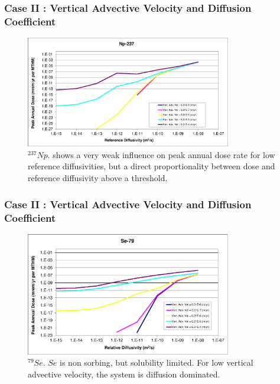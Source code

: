 \begin{frame}[c]
  \frametitle{Case II : Vertical Advective Velocity and Diffusion Coefficient}
\begin{figure}[htp!]
\centering
\includegraphics[width=0.8\textwidth]{AdvVelAndDiffCoeffEBSFail/Np-237.eps}
\caption{$^{237}Np$.
shows a very weak influence on peak annual dose 
rate for low reference diffusivities, but a direct proportionality between 
dose and reference diffusivity above a threshold.}
\label{fig:VAdvVelNp237}
\end{figure}
\end{frame}

\begin{frame}[c]
  \frametitle{Case II : Vertical Advective Velocity and Diffusion Coefficient}
\begin{figure}[htp!]
\centering
\includegraphics[width=0.8\textwidth]{AdvVelAndDiffCoeffEBSFail/Se-79.eps}
\caption{$^{79}Se$.
$Se$ is non sorbing, but solubility limited.  
For low vertical advective velocity, 
the system is diffusion dominated.}
\label{fig:VAdvVelSe79}
\end{figure}
\end{frame}


